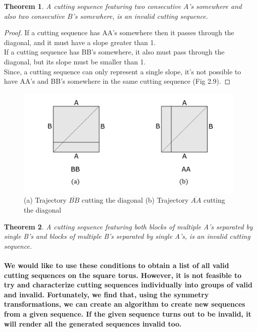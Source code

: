 \documentclass{report}
\newtheorem{theorem}{Theorem}[chapter]
\begin{document}
\begin{theorem}
A cutting sequence featuring two consecutive $A$’s somewhere and also two consecutive $B$’s somewhere, is an invalid cutting sequence.
\end{theorem}

\begin{proof}
If a cutting sequence has AA’s somewhere then it passes through the diagonal, and it must have a slope greater than 1. \\ 
If a cutting sequence has BB’s somewhere, it also must pass through the diagonal, but its slope must be smaller than 1. \\ 
Since, a cutting sequence can only represent a single slope, it's not possible to have AA’s and BB’s somewhere in the same cutting sequence (Fig 2.9).
\end{proof}

\begin{figure}[h] 
\begin{center}
\includegraphics[scale=0.3]{2.9}
\caption{(a) Trajectory $\overline{BB}$ cutting the diagonal (b) Trajectory $\overline{AA}$ cutting the diagonal
}
\end{center}
\end{figure}

\begin{theorem}
A cutting sequence featuring both blocks of multiple A’s separated by single B’s and blocks of multiple B’s separated by single A’s, is an invalid cutting sequence.
\end{theorem}

\paragraph{We would like to use these conditions to obtain a list of all valid cutting sequences on the square torus. However, it is not feasible to try and characterize cutting sequences individually into groups of valid and invalid. Fortunately, we find that, using the symmetry transformations, we can create an algorithm to create new sequences from a given sequence. If the given sequence turns out to be invalid, it will render all the generated sequences invalid too.}
\end{document}
